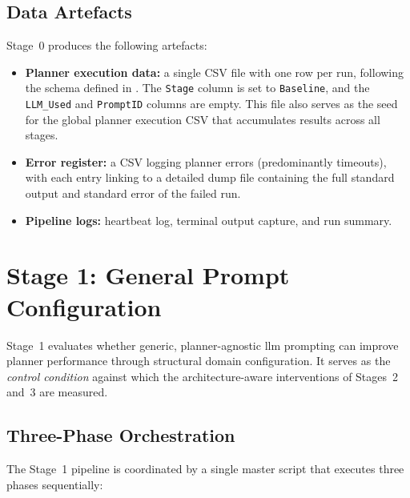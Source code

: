 \subsection{Data Artefacts}
\label{sec:design:stage0:data}

Stage~0 produces the following artefacts:

\begin{itemize}
  \item \textbf{Planner execution data:} a single CSV file with one row per run, following the schema defined in .
        The \texttt{Stage} column is set to \texttt{Baseline}, and the \texttt{LLM\_Used} and \texttt{PromptID} columns are empty.
        This file also serves as the seed for the global planner execution CSV that accumulates results across all stages.
  \item \textbf{Error register:} a CSV logging planner errors (predominantly timeouts), with each entry linking to a detailed dump file containing the full standard output and standard error of the failed run.
  \item \textbf{Pipeline logs:} heartbeat log, terminal output capture, and run summary.
\end{itemize}


\section{Stage 1: General Prompt Configuration}
\label{sec:design:stage1}

Stage~1 evaluates whether generic, planner-agnostic \gls{llm} prompting can improve planner performance through structural domain configuration.
It serves as the \emph{control condition} against which the architecture-aware interventions of Stages~2 and~3 are measured.

\subsection{Three-Phase Orchestration}
\label{sec:design:stage1:orchestration}

The Stage~1 pipeline is coordinated by a single master script that executes three phases sequentially:

